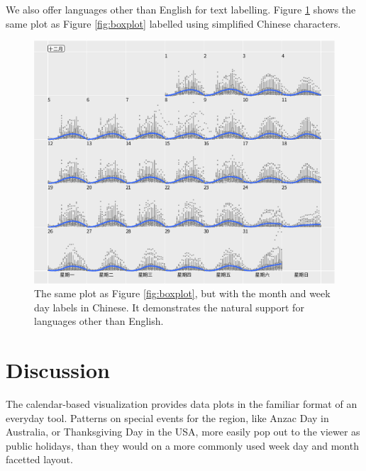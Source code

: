 \documentclass[article]{jss}
\theoremstyle{definition}
\theoremstyle{definition}
\theoremstyle{remark}
\begin{document}
We also offer languages other than English for text labelling. Figure
\ref{fig:chn} shows the same plot as Figure \ref{fig:boxplot} labelled
using simplified Chinese characters.

\begin{CodeChunk}
\begin{figure}

{\centering \includegraphics[width=\textwidth]{figure/chn-1} 

}

\caption[The same plot as Figure \ref{fig:boxplot}, but with the
month and week day labels in Chinese. It demonstrates the natural
support for languages other than English.]{The same plot as Figure \ref{fig:boxplot}, but with the
month and week day labels in Chinese. It demonstrates the natural
support for languages other than English.}\label{fig:chn}
\end{figure}
\end{CodeChunk}





\section{Discussion}\label{discussion}

\label{sec:discussion}

The calendar-based visualization provides data plots in the familiar
format of an everyday tool. Patterns on special events for the region,
like Anzac Day in Australia, or Thanksgiving Day in the USA, more easily
pop out to the viewer as public holidays, than they would on a more
commonly used week day and month facetted layout.
\end{document}
